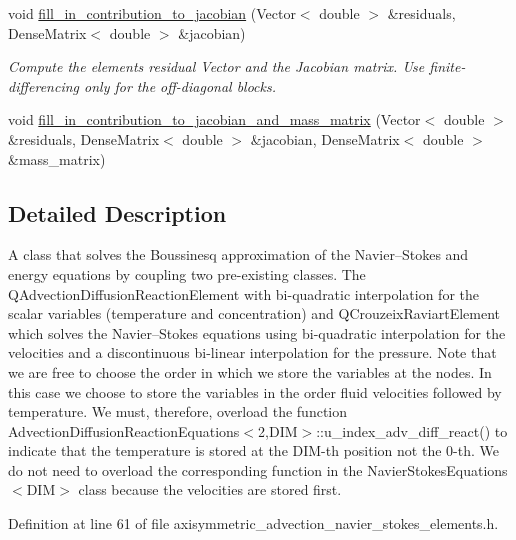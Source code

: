 \begin{DoxyCompactItemize}
void \hyperlink{classoomph_1_1AxisymmetricQAdvectionCrouzeixRaviartElement_a89c5d3e012d9a8ca36e4e54fd26197b8}{fill\+\_\+in\+\_\+contribution\+\_\+to\+\_\+jacobian} (Vector$<$ double $>$ \&residuals, Dense\+Matrix$<$ double $>$ \&jacobian)
\begin{DoxyCompactList}\small\item\em Compute the element\textquotesingle{}s residual Vector and the Jacobian matrix. Use finite-\/differencing only for the off-\/diagonal blocks. \end{DoxyCompactList}\item 
void \hyperlink{classoomph_1_1AxisymmetricQAdvectionCrouzeixRaviartElement_a4b312d9e599923029c0c3f1362488ea4}{fill\+\_\+in\+\_\+contribution\+\_\+to\+\_\+jacobian\+\_\+and\+\_\+mass\+\_\+matrix} (Vector$<$ double $>$ \&residuals, Dense\+Matrix$<$ double $>$ \&jacobian, Dense\+Matrix$<$ double $>$ \&mass\+\_\+matrix)
\end{DoxyCompactItemize}


\subsection{Detailed Description}
A class that solves the Boussinesq approximation of the Navier--Stokes and energy equations by coupling two pre-\/existing classes. The Q\+Advection\+Diffusion\+Reaction\+Element with bi-\/quadratic interpolation for the scalar variables (temperature and concentration) and Q\+Crouzeix\+Raviart\+Element which solves the Navier--Stokes equations using bi-\/quadratic interpolation for the velocities and a discontinuous bi-\/linear interpolation for the pressure. Note that we are free to choose the order in which we store the variables at the nodes. In this case we choose to store the variables in the order fluid velocities followed by temperature. We must, therefore, overload the function Advection\+Diffusion\+Reaction\+Equations$<$2,\+D\+I\+M$>$\+::u\+\_\+index\+\_\+adv\+\_\+diff\+\_\+react() to indicate that the temperature is stored at the D\+I\+M-\/th position not the 0-\/th. We do not need to overload the corresponding function in the Navier\+Stokes\+Equations$<$\+D\+I\+M$>$ class because the velocities are stored first. 

Definition at line 61 of file axisymmetric\+\_\+advection\+\_\+navier\+\_\+stokes\+\_\+elements.\+h.




